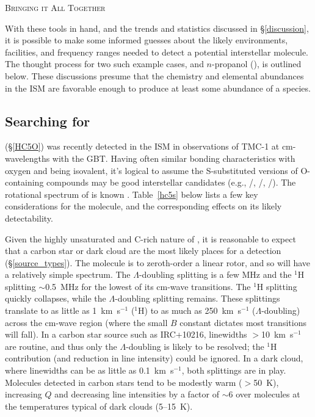 \documentclass[twocolumn]{aastex631}
\begin{document}
\begin{center}
\textsc{Bringing it All Together}
\end{center}

With these tools in hand, and the trends and statistics discussed in \S\ref{discussion}, it is possible to make some informed guesses about the likely environments, facilities, and frequency ranges needed to detect a potential interstellar molecule.  The thought process for two such example cases,  and $n$-propanol (), is outlined below.  These discussions presume that the chemistry and elemental abundances in the ISM are favorable enough to produce at least some abundance of a species.

\subsection{Searching for }

 (\S\ref{HC5O}) was recently detected in the ISM in observations of TMC-1 at cm-wavelengths with the GBT.  Having often similar bonding characteristics with oxygen and being isovalent, it's logical to assume the S-substituted versions of O-containing compounds may be good interstellar candidates (e.g., /, /, /).  The rotational spectrum of  is known \citep{Gordon:2002kd}.  Table~\ref{hc5s} below lists a few key considerations for the molecule, and the corresponding effects on its likely detectability.



Given the highly unsaturated and C-rich nature of , it is reasonable to expect that a carbon star or dark cloud are the most likely places for a detection (\S\ref{source_types}).  The molecule is to zeroth-order a linear rotor, and so will have a relatively simple spectrum.  The $\Lambda$-doubling splitting is a few MHz and the $^1$H splitting $\sim$0.5~MHz for the lowest of its cm-wave transitions.  The $^1$H splitting quickly collapses, while the $\Lambda$-doubling splitting remains.  These splittings translate to as little as 1~km~s$^{-1}$ ($^1$H) to as much as 250~km~s$^{-1}$ ($\Lambda$-doubling) across the cm-wave region (where the small $B$ constant dictates most transitions will fall).  In a carbon star source such as IRC+10216, linewidths $>$10~km~s$^{-1}$ are routine, and thus only the $\Lambda$-doubling is likely to be resolved; the $^1$H contribution (and reduction in line intensity) could be ignored.  In a dark cloud, where linewidths can be as little as 0.1~km~s$^{-1}$, both splittings are in play.  Molecules detected in carbon stars tend to be modestly warm ($>$50~K), increasing $Q$ and decreasing line intensities by a factor of $\sim$6 over molecules at the temperatures typical of dark clouds (5--15~K).  
\end{document}
